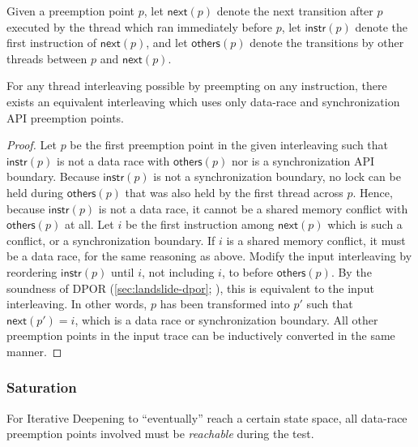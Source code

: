 \newcommand\ppnext[1]{\ensuremath{\mathsf{next}(#1)}}
\newcommand\ppinstr[1]{\ensuremath{\mathsf{instr}(#1)}}
\newcommand\ppothers[1]{\ensuremath{\mathsf{others}(#1)}}

Given a preemption point $p$,
let $\ppnext{p}$ denote the next transition after $p$ executed by the thread which ran immediately before $p$,
let $\ppinstr{p}$ denote the first instruction of $\ppnext{p}$,
and let $\ppothers{p}$ denote the transitions by other threads between $p$ and $\ppnext{p}$.

\vspace{0.5em}
\begin{lemma}
	For any thread interleaving possible by preempting on any instruction,
	there exists an equivalent interleaving which uses only data-race and synchronization API preemption points.
        \label{lem:relevant}
\end{lemma}

\begin{proof}
Let $p$ be the first preemption point in the given interleaving
such that $\ppinstr{p}$ is not a data race with $\ppothers{p}$ nor is a synchronization API boundary.
Because $\ppinstr{p}$ is not a synchronization boundary,
no lock can be held during $\ppothers{p}$ that was also held by the first thread across $p$.
Hence, because $\ppinstr{p}$ is not a data race, it cannot be a shared memory conflict with $\ppothers{p}$ at all.
Let $i$ be the first instruction among $\ppnext{p}$ which is such a conflict, or a synchronization boundary.
If $i$ is a shared memory conflict, it must be a data race, for the same reasoning as above.
Modify the input interleaving by reordering $\ppinstr{p}$ until $i$, not including $i$, to before $\ppothers{p}$.
By the soundness of DPOR (\cref{sec:landslide-dpor}; \cite{dpor}), this is equivalent to the input interleaving.
In other words, $p$ has been transformed into $p'$ such that $\ppnext{p'} = i$,
which is a data race or synchronization boundary.
All other preemption points in the input trace can be inductively converted in the same manner.
\end{proof}

\subsubsection{Saturation}

For Iterative Deepening to ``eventually'' reach a certain state space,
all data-race preemption points involved must be {\em reachable} during the test.

